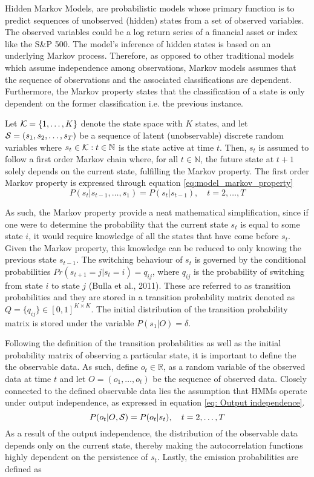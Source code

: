 Hidden Markov Models, are probabilistic models whose primary function is to predict sequences of unobserved (hidden) states from a set of observed variables. The observed variables could be a log return series of a financial asset or index like the S\&P 500. The model’s inference of hidden states is based on an underlying Markov process. Therefore, as opposed to other traditional models which assume independence among observations, Markov models assumes that the sequence of observations and the associated classifications are dependent. Furthermore, the Markov property states that the classification of a state is only dependent on the former classification i.e. the previous instance. 

Let $\K=\{ 1,\ldots, K \}$ denote the state space with $K$ states, and let $\S=(s_1,s_2,\ldots,s_T)$ be a sequence of latent (unobservable) discrete random variables where $s_t\in\K: t\in \mathbb{N}$ is the state active at time $t$. Then, $s_t$ is assumed to follow a first order Markov chain where, for all $t \in \mathbb{N}$, the future state at $t + 1$ solely depends on the current state, fulfilling the Markov property. The first order Markov property is expressed through equation \ref{eq:model_markov_property}
\begin{equation}
    P(s_t | s_{t-1},\ldots,s_1) = P(s_t | s_{t-1}),
    \quad t=2,\ldots,T
    \label{eq:model_markov_property}
\end{equation} 

As such, the Markov property provide a neat mathematical simplification, since if one were to determine the probability that the current state $s_t$ is equal to some state $i$, it would require knowledge of all the states that have come before $s_t$. Given the Markov property, this knowledge can be reduced to only knowing the previous state $s_{t-1}$. The switching behaviour of $s_t$ is governed by the conditional probabilities $Pr(s_{t+1} = j| s_t = i) = q_{ij}$, where $q_{ij}$ is the probability of switching from state $i$ to state $j$ (Bulla et al., 2011). These are referred to as transition probabilities and they are stored in a transition probability matrix denoted as $Q = \{q_{ij}\} \in [0,1]^{K \times K}$. The initial distribution of the transition probability matrix is stored under the variable $P(s_1|O)= \delta$.

Following the definition of the transition probabilities as well as the initial probability matrix of observing a particular state, it is important to define the the observable data. As such, define $o_t \in \mathbb{R}$, as a random variable of the observed data at time $t$ and let $O=(o_1,\ldots,o_t)$ be the sequence of observed data. Closely connected to the defined observable data lies the assumption that HMMs operate under output independence, as expressed in equation \ref{eq: Output independence}.
\begin{equation}
    P(o_t|O, \S) = P(o_t|s_t),
    \quad t=2,\ldots,T
    \label{eq: Output independence}
\end{equation}
As a result of the output independence, the distribution of the observable data depends only on the current state, thereby making the autocorrelation functions highly dependent on the persistence of $s_t$. Lastly, the emission probabilities are defined as

